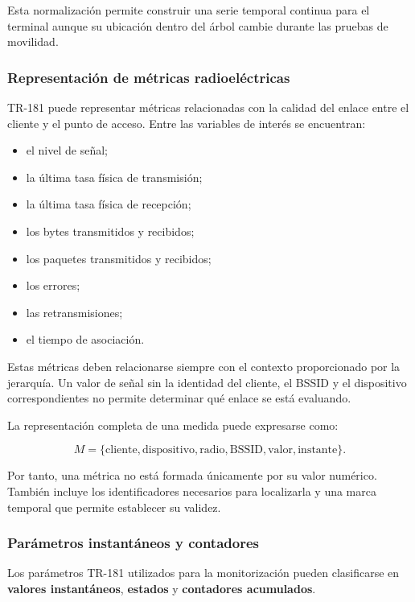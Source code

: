 Esta normalización permite construir una serie temporal continua para el
terminal aunque su ubicación dentro del árbol cambie durante las pruebas
de movilidad.


\subsubsection*{Representación de métricas radioeléctricas}

TR-181 puede representar métricas relacionadas con la calidad del enlace
entre el cliente y el punto de acceso. Entre las variables de interés se
encuentran:

\begin{itemize}
    \item el nivel de señal;
    \item la última tasa física de transmisión;
    \item la última tasa física de recepción;
    \item los bytes transmitidos y recibidos;
    \item los paquetes transmitidos y recibidos;
    \item los errores;
    \item las retransmisiones;
    \item el tiempo de asociación.
\end{itemize}

Estas métricas deben relacionarse siempre con el contexto proporcionado
por la jerarquía. Un valor de señal sin la identidad del cliente, el
BSSID y el dispositivo correspondientes no permite determinar qué enlace
se está evaluando.

La representación completa de una medida puede expresarse como:

\[
    M =
    \{
        \text{cliente},
        \text{dispositivo},
        \text{radio},
        \text{BSSID},
        \text{valor},
        \text{instante}
    \}.
\]

Por tanto, una métrica no está formada únicamente por su valor numérico.
También incluye los identificadores necesarios para localizarla y una
marca temporal que permite establecer su validez.


\subsubsection*{Parámetros instantáneos y contadores}

Los parámetros TR-181 utilizados para la monitorización pueden
clasificarse en \textbf{valores instantáneos}, \textbf{estados} y
\textbf{contadores acumulados}.

